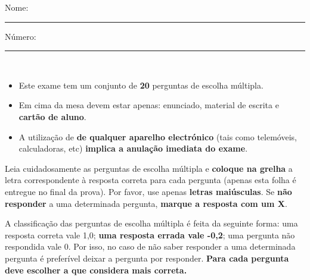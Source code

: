 \thispagestyle{empty}

\vspace*{-2cm}

\begin{center}
  Nome: \rule{9cm}{1pt} Número: \rule{2cm}{1pt}\\
\end{center}

\begin{itemize}
\item Este exame tem um conjunto de \textbf{20} perguntas de escolha
  múltipla.
\item Em cima da mesa devem estar apenas: enunciado, material de
  escrita e \textbf{cartão de aluno}. %
 
\item A utilização de {\bf de qualquer aparelho electrónico} (tais como
    telemóveis, calculadoras, etc) {\bf implica a anulação imediata do exame}.
\end{itemize}

{\small
Leia cuidadosamente as perguntas de escolha múltipla e {\bf coloque na
  grelha} a letra correspondente à resposta correta para cada
pergunta (apenas esta folha é entregue no final da prova).  Por favor, use apenas {\bf letras maiúsculas}. Se {\bf não
  responder} a uma determinada pergunta, {\bf marque a resposta com um
  {\sf X}}.
}

{\small
A classificação das perguntas de escolha múltipla é feita da seguinte
forma: uma {res\-posta} correta vale 1,0; \textbf{uma resposta errada
  vale -0,2}; uma pergunta não respondida vale 0. Por isso, no
caso de não saber responder a uma determinada pergunta é preferível
deixar a pergunta por responder. \textbf{Para cada pergunta deve escolher a que considera mais
  correta.}
}

\vspace*{-0,3cm}

